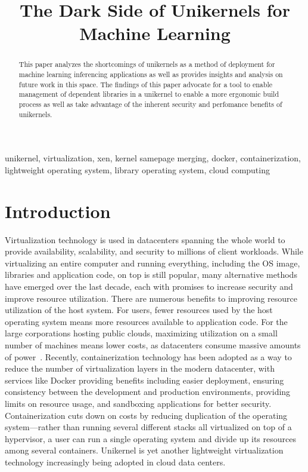\documentclass[conference]{IEEEtran}
\begin{document}
\title{The Dark Side of Unikernels for Machine Learning}

\author{
}

\maketitle

\begin{abstract}
  This paper analyzes the shortcomings of unikernels as a method
  of deployment for machine learning inferencing applications as
  well as provides insights and analysis on future work in this
  space. The findings of this paper advocate for a tool to enable
  management of dependent libraries in a unikernel to enable a
  more ergonomic build process as well as take advantage of the
  inherent security and perfomance benefits of unikernels.
\end{abstract}

\begin{IEEEkeywords}
  unikernel, virtualization, xen, kernel samepage merging,
  docker, containerization, lightweight operating system, library
  operating system, cloud computing
\end{IEEEkeywords}

\section{Introduction}

Virtualization technology is used in datacenters spanning the
whole world to provide availability, scalability, and security to
millions of client workloads. While virtualizing an entire
computer and running everything, including the OS image,
libraries and application code, on top is still popular, many
alternative methods have emerged over the last decade, each with
promises to increase security and improve resource utilization.
There are numerous benefits to improving resource utilization of
the host system. For users, fewer resources used by the host
operating system means more resources available to application
code. For the large corporations hosting public clouds,
maximizing utilization on a small number of machines means lower
costs, as datacenters consume massive amounts of
power~\cite{directenergy}.  Recently, containerization technology
has been adopted as a way to reduce the number of virtualization
layers in the modern datacenter, with services like Docker
providing benefits including easier deployment, ensuring
consistency between the development and production environments,
providing limits on resource usage, and sandboxing applications
for better security.  Containerization cuts down on costs by
reducing duplication of the operating system—rather than running
several different stacks all virtualized on top of a hypervisor,
a user can run a single operating system and divide up its
resources among several containers. Unikernel is yet another
lightweight virtualization technology increasingly being adopted
in cloud data centers.
\end{document}
